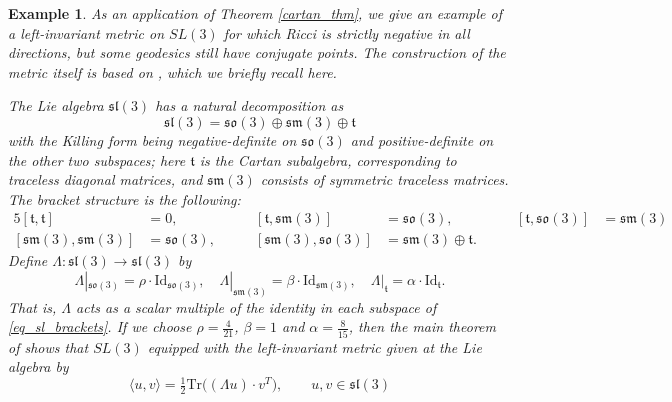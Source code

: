 \documentclass[oneside, 11pt]{amsart}
\newtheorem{example}[theorem]{Example}
\numberwithin{equation}{section}
\begin{document}
 
 



 




\begin{example}\label{sl3-example}
As an application of Theorem \ref{cartan_thm}, we give an example of a left-invariant metric on $SL(3)$ for which Ricci is \emph{strictly negative} in all directions, but some geodesics still have conjugate points. The construction of the metric itself is based on \cite{leite}, which we briefly recall here. 

The Lie algebra $\mathfrak{sl}(3)$ has a natural decomposition as
\begin{equation}\label{eq_sl_brackets}
\mathfrak{sl}(3) = \mathfrak{so}(3) \oplus \mathfrak{sm}(3) \oplus \mathfrak{t}
\end{equation}
with the Killing form  
being negative-definite on $\mathfrak{so}(3)$ and positive-definite on the other two subspaces; here $\mathfrak{t}$ is the Cartan subalgebra, corresponding to traceless \emph{diagonal} matrices, and $\mathfrak{sm}(3)$ consists of symmetric traceless matrices. The bracket structure is the following:
\begin{alignat*}{5}
[\mathfrak{t}, \mathfrak{t}] &= 0, \qquad
&[\mathfrak{t}, \mathfrak{sm}(3)] &= \mathfrak{so}(3), &\qquad [\mathfrak{t}, \mathfrak{so}(3)] &= \mathfrak{sm}(3) \\ 
[\mathfrak{sm}(3), \mathfrak{sm}(3)] &= \mathfrak{so}(3),
\qquad
&[\mathfrak{sm}(3), \mathfrak{so}(3)] &= \mathfrak{sm}(3) \oplus \mathfrak{t}.&&
\end{alignat*}
Define $\Lambda : \mathfrak{sl}(3) \rightarrow \mathfrak{sl}(3)$ by
\begin{equation*} 
\Lambda|_{\mathfrak{so}(3)} = \rho \cdot \mathrm{Id}_{\mathfrak{so}(3)}, \quad
\Lambda|_{\mathfrak{sm}(3)} = \beta \cdot \mathrm{Id}_{\mathfrak{sm}(3)}, \quad
\Lambda|_{\mathfrak{t}} = \alpha \cdot \mathrm{Id}_{\mathfrak{t}}.
\end{equation*}
That is, $\Lambda$ acts as a scalar multiple of the identity in each subspace of \eqref{eq_sl_brackets}. If we choose $\rho = \frac{4}{21}$, $\beta = 1$ and $\alpha = \frac{8}{15}$, then the main theorem of \cite{leite} shows that $SL(3)$ equipped with the left-invariant metric given at the Lie algebra by
\begin{equation*}
\langle u, v \rangle = \tfrac{1}{2} \mathrm{Tr}\big((\Lambda u)\cdot v^T\big), \qquad u, v \in \mathfrak{sl}(3)
\end{equation*}

\end{example}
\end{document}
